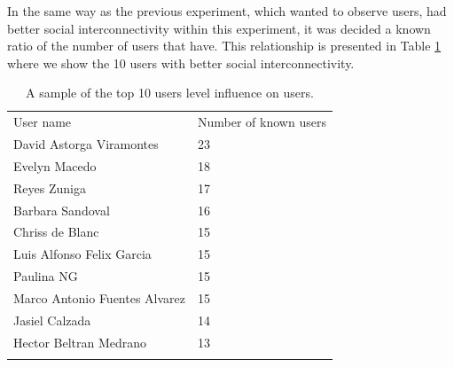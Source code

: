 In the same way as the previous experiment, which wanted to observe users, had
better social interconnectivity within this experiment, it was decided a known
ratio of the number of users that have. This relationship is presented in Table
\ref{tab:knownUsers_3}  where we show the 10 users with better social
interconnectivity.

\begin{table}
\small
\caption{A sample of the top 10 users level influence on users.}
\label{tab:knownUsers_3}
\centering
\small
\begin{tabular}{p{3cm} p{3cm}  }
\hline\noalign{\smallskip}
 User name & Number of known users \\
\noalign{\smallskip}\hline\noalign{\smallskip}
\small{David Astorga Viramontes} & \small{23}  \\ \hline
\small{Evelyn Macedo} & \small{18}  \\ \hline
\small{Reyes Zuniga} & \small{17}  \\ \hline
\small{Barbara Sandoval} & \small{16}  \\ \hline
\small{Chriss de Blanc} & \small{15}  \\ \hline
\small{Luis Alfonso Felix Garcia} & \small{15}  \\ \hline
\small{Paulina NG} & \small{15}  \\ \hline
\small{Marco Antonio Fuentes Alvarez} & \small{15}  \\ \hline
\small{Jasiel Calzada} & \small{14}  \\ \hline
\small{Hector Beltran Medrano} & \small{13}  \\ \hline
\noalign{\smallskip}\hline
\end{tabular}
\end{table}



